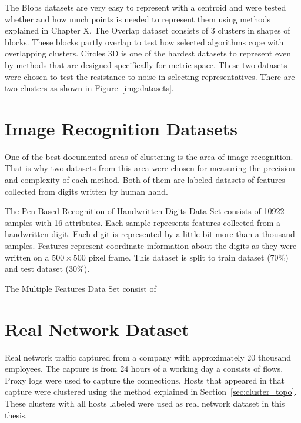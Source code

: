 \documentclass[thesis=B,english]{FITthesis}[2012/10/20]
\begin{document}
The Blobs datasets are very easy to represent with a centroid and were tested whether and how much points is needed to represent them using methods explained in Chapter X.  The Overlap dataset consists of 3 clusters in shapes of blocks.
These blocks partly overlap to test how selected algorithms cope with overlapping clusters.
Circles 3D is one of the hardest datasets to represent even by methods that are designed specifically for metric space.
These two datasets were chosen to test the resistance to noise in selecting representatives.
There are two clusters as shown in Figure~\ref{img:datasets}.

\section{Image Recognition Datasets}
One of the best-documented areas of clustering is the area of image recognition.
That is why two datasets from this area were chosen for measuring the precision and complexity of each method.
Both of them are labeled datasets of features collected from digits written by human hand.

The Pen-Based Recognition of Handwritten Digits Data Set \cite{dua1998pendigit} consists of 10922 samples with 16 attributes.
Each sample represents features collected from a handwritten digit.
Each digit is represented by a little bit more than a thousand samples.
Features represent coordinate information about the digits as they were written on a $500\times500$ pixel frame.
This dataset is split to train dataset (70\%) and test dataset (30\%).

The Multiple Features Data Set \cite{dua1998pendigit} consist of  

\section{Real Network Dataset}\label{sec:real-data}
Real network traffic captured from a company with approximately 20 thousand employees.
The capture is from 24 hours of a working day a consists of  flows.
Proxy logs were used to capture the connections.
Hosts that appeared in that capture were clustered using the method explained in Section~\ref{sec:cluster_topo}.
These clusters with all hosts labeled were used as real network dataset in this thesis.


\end{document}
